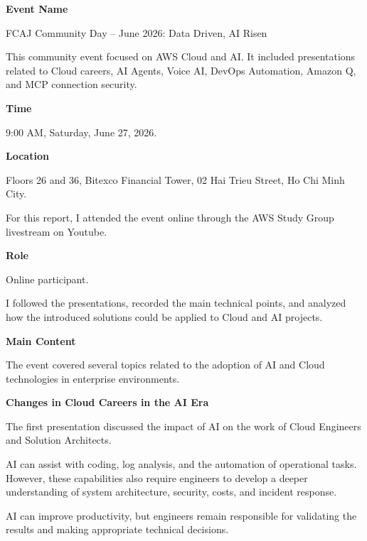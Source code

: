 \vspace{0.5em}\noindent\textbf{Event Name}\par

FCAJ Community Day -- June 2026: Data Driven, AI Risen

This community event focused on AWS Cloud and AI. It included
presentations related to Cloud careers, AI Agents, Voice AI, DevOps
Automation, Amazon Q, and MCP connection security.

\vspace{0.5em}\noindent\textbf{Time}\par

9:00 AM, Saturday, June 27, 2026.

\vspace{0.5em}\noindent\textbf{Location}\par

Floors 26 and 36, Bitexco Financial Tower, 02 Hai Trieu Street, Ho Chi
Minh City.

For this report, I attended the event online through the AWS Study Group
livestream on Youtube.

\vspace{0.5em}\noindent\textbf{Role}\par

Online participant.

I followed the presentations, recorded the main technical points, and
analyzed how the introduced solutions could be applied to Cloud and AI
projects.

\vspace{0.5em}\noindent\textbf{Main Content}\par

The event covered several topics related to the adoption of AI and Cloud
technologies in enterprise environments.

\vspace{0.5em}\noindent\textbf{Changes in Cloud Careers in the AI
Era}\par

The first presentation discussed the impact of AI on the work of Cloud
Engineers and Solution Architects.

AI can assist with coding, log analysis, and the automation of
operational tasks. However, these capabilities also require engineers to
develop a deeper understanding of system architecture, security, costs,
and incident response.

AI can improve productivity, but engineers remain responsible for
validating the results and making appropriate technical decisions.

